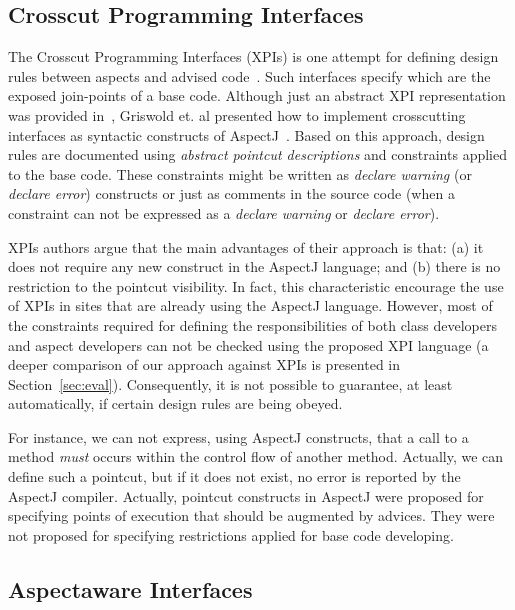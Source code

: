 \subsection{Crosscut Programming Interfaces}

The Crosscut Programming Interfaces (XPIs) is one attempt for defining design
rules between aspects and advised
code~\cite{sullivan-sigsoft-2005,sullivan-ieee-sw-2006}. Such interfaces specify
which are the exposed join-points of a base code. Although just an abstract XPI
representation was provided in~\cite{sullivan-sigsoft-2005}, Griswold et. al
presented how to implement crosscutting interfaces as syntactic constructs of
AspectJ~\citet{sullivan-ieee-sw-2006}. Based on this approach, design rules are
documented using \emph{abstract pointcut descriptions} and constraints applied to
the base code. These constraints might be written as \emph{declare warning} (or
\emph{declare error}) constructs or just as comments in the source code (when a
constraint can not be expressed as a \emph{declare warning} or \emph{declare
error}). 

XPIs authors argue that the main advantages of their approach is that:
(a) it does not require any new construct in the AspectJ language; and (b) there
is no restriction to the pointcut visibility. In fact, this characteristic
encourage the use of XPIs in sites that are already using the AspectJ language.
However, most of the constraints required for defining the responsibilities of
both class developers and aspect developers can not be checked using the proposed
XPI language (a deeper comparison of our approach against XPIs is presented in
Section~\ref{sec:eval}). Consequently, it is not possible to guarantee, at least
automatically, if certain design rules are being obeyed. 

For instance, we can not
express, using AspectJ constructs, that a call to a method \emph{must} occurs
within the control flow of another method. Actually, we can define such a
pointcut, but if it does not exist,  no error is reported by the AspectJ
compiler. Actually, pointcut constructs in AspectJ were proposed for specifying
points of execution that should be augmented by advices. They were not proposed
for specifying restrictions applied for base code developing.

\subsection{Aspectaware Interfaces}

